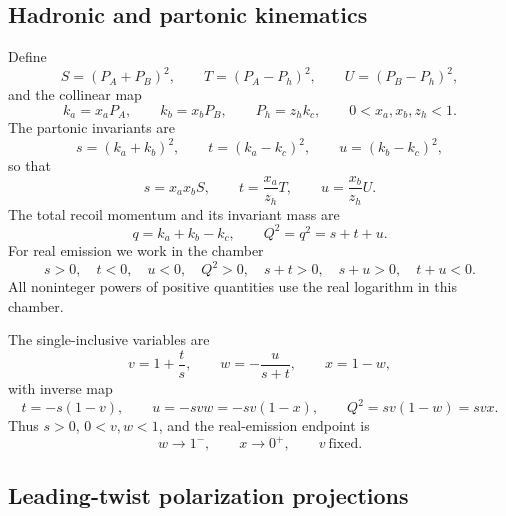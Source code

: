 \subsection{Hadronic and partonic kinematics}

Define
\begin{equation}
 S=(P_A+P_B)^2,
 \qquad T=(P_A-P_h)^2,
 \qquad U=(P_B-P_h)^2,
 \label{eq:hadronic-invariants}
\end{equation}
and the collinear map
\begin{equation}
 k_a=x_aP_A,
 \qquad k_b=x_bP_B,
 \qquad P_h=z_hk_c,
 \qquad 0<x_a,x_b,z_h<1.
 \label{eq:collinear-map}
\end{equation}
The partonic invariants are
\begin{equation}
 s=(k_a+k_b)^2,
 \qquad t=(k_a-k_c)^2,
 \qquad u=(k_b-k_c)^2,
 \label{eq:partonic-invariants}
\end{equation}
so that
\begin{equation}
 s=x_ax_bS,
 \qquad t=\frac{x_a}{z_h}T,
 \qquad u=\frac{x_b}{z_h}U.
 \label{eq:hadronic-partonic-map}
\end{equation}
The total recoil momentum and its invariant mass are
\begin{equation}
 q=k_a+k_b-k_c,
 \qquad Q^2=q^2=s+t+u.
 \label{eq:recoil-invariant}
\end{equation}
For real emission we work in the chamber
\begin{equation}
 s>0,\quad t<0,\quad u<0,\quad Q^2>0,\quad
 s+t>0,\quad s+u>0,\quad t+u<0.
 \label{eq:physical-chamber}
\end{equation}
All noninteger powers of positive quantities use the real logarithm in this
chamber.

The single-inclusive variables are
\begin{equation}
 v=1+\frac{t}{s},
 \qquad w=-\frac{u}{s+t},
 \qquad x=1-w,
 \label{eq:vw-definitions}
\end{equation}
with inverse map
\begin{equation}
 t=-s(1-v),
 \qquad u=-svw=-sv(1-x),
 \qquad Q^2=sv(1-w)=svx.
 \label{eq:vw-inverse}
\end{equation}
Thus $s>0$, $0<v,w<1$, and the real-emission endpoint is
\begin{equation}
 w\to1^-,\qquad x\to0^+,
 \qquad v\ \text{fixed}.
 \label{eq:real-endpoint}
\end{equation}

\subsection{Leading-twist polarization projections}

